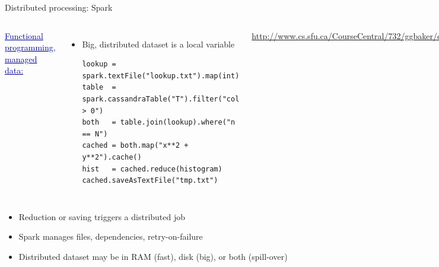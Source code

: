 \documentclass[aspectratio=169]{beamer}
\begin{document}
\begin{frame}[fragile]{Distributed processing: Spark}
\vspace{0.5 cm}
\begin{columns}[b]
\textcolor{darkblue}{\Large \underline{Functional programming, managed data:}}

\large
\vspace{0.25 cm}
\begin{itemize}
\item Big, distributed dataset is a local variable

\scriptsize
\begin{verbatim}
lookup = spark.textFile("lookup.txt").map(int)
table  = spark.cassandraTable("T").filter("col > 0")
both   = table.join(lookup).where("n == N")
cached = both.map("x**2 + y**2").cache()
hist   = cached.reduce(histogram)
cached.saveAsTextFile("tmp.txt")
\end{verbatim}
\end{itemize}

\tiny

\textcolor{blue}{\url{http://www.cs.sfu.ca/CourseCentral/732/ggbaker/content/spark.html}}

\vspace{0.2 cm}
\includegraphics[width=\linewidth]{spark-dag.png}
\end{columns}

\large
\begin{itemize}
\item Reduction or saving triggers a distributed job
\item Spark manages files, dependencies, retry-on-failure
\item Distributed dataset may be in RAM (fast), disk (big), or both (spill-over)
\end{itemize}
\end{frame}
\end{document}
